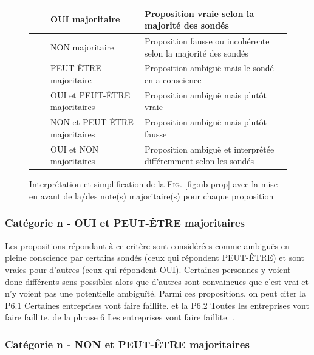 \documentclass[11pt,letterpaper]{article}
\begin{document}
\begin{figure}[htbp]
\begin{center}
\begin{tabular}{|cc|l|l|}
    \hline
      \cellcolor{green} & \cellcolor{green} & OUI majoritaire & Proposition vraie selon la majorité des sondés\\
      \hline
      \cellcolor{red} & \cellcolor{red} & NON majoritaire & Proposition fausse ou incohérente selon la majorité des sondés\\
      \hline
      \cellcolor{blue} & \cellcolor{blue} & PEUT-ÊTRE majoritaire & Proposition ambiguë mais le sondé en a conscience \\
      \hline
      \cellcolor{green} & \cellcolor{blue} & OUI et PEUT-ÊTRE majoritaires & Proposition ambiguë mais plutôt vraie \\
      \hline
      \cellcolor{red} & \cellcolor{blue} & NON et PEUT-ÊTRE majoritaires & Proposition ambiguë mais plutôt fausse \\
      \hline
      \cellcolor{green} & \cellcolor{red} & OUI et NON majoritaires & Proposition ambiguë et interprétée différemment selon les sondés \\
      \hline
\end{tabular}
\caption{Interprétation et simplification de la \textsc{Fig. }\ref{fig:nb-prop} avec la mise en avant de la/des note(s) majoritaire(s) pour chaque proposition}
\label{fig:tab-nb-prop}
\end{center}
\end{figure}

\subsubsection{Catégorie n - \og OUI \fg{} et \og PEUT-ÊTRE \fg{} majoritaires}

Les propositions répondant à ce critère sont considérées comme ambiguës en pleine conscience par certains sondés (ceux qui répondent PEUT-ÊTRE) et sont vraies pour d'autres (ceux qui répondent OUI). Certaines personnes y voient donc différents sens possibles alors que d'autres sont convaincues que c'est vrai et n'y voient pas une potentielle ambiguïté. Parmi ces propositions, on peut citer la P6.1 \og Certaines entreprises vont faire faillite. \fg{} et la P6.2 \og Toutes les entreprises vont faire faillite. \fg{} de la phrase 6 \og Les entreprises vont faire faillite. \fg{}.

\subsubsection{Catégorie n - \og NON \fg{} et \og PEUT-ÊTRE \fg{} majoritaires}
\end{document}
